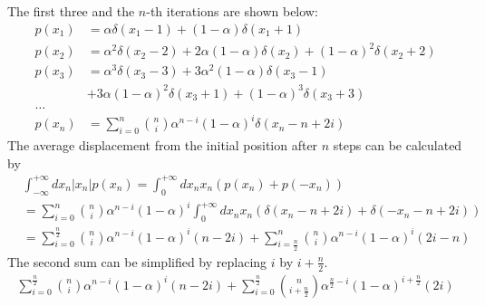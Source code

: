 \documentclass{tstextbook}
\begin{document}
\begin{example}
The first three and the $n$-th iterations are shown below:
  \begin{equation}
  \begin{aligned}
  p\left(x_{1}\right) &= \alpha \delta\left(x_{1}-1\right)+(1-\alpha) \delta\left(x_{1}+1\right)\\   p\left(x_{2}\right) &= \alpha^2 \delta\left(x_{2}-2\right)                       + 2 \alpha (1-\alpha) \delta\left(x_{2}\right) + (1-\alpha)^2 \delta\left(x_{2}+2\right)\\
  p\left(x_{3}\right) &= \alpha^3 \delta\left(x_{3}-3\right)                       + 3 \alpha^2 (1-\alpha) \delta\left(x_{3}-1\right) \\
  & + 3 \alpha (1-\alpha)^2 \delta\left(x_{3}+1\right) + (1-\alpha)^3 \delta\left(x_{3}+3\right)\\
  \ldots & \\
  p\left(x_{n}\right) &= \sum_{i=0}^{n}{{n}\choose{i}}\alpha^{n-i} (1-\alpha)^{i} \delta\left(x_{n}-n+2i\right)
  \end{aligned}
  \end{equation}
The average displacement from the initial position after $n$ steps can be calculated by
  \begin{equation}
  \begin{aligned}
  & \int_{-\infty}^{+\infty}dx_{n}\vert x_{n} \vert p\left(x_{n}\right) = \int_{0}^{+\infty}dx_{n} x_{n} \left(p\left(x_{n}\right) + p\left(-x_{n}\right)\right)\\
&=\sum_{i=0}^{n}{{n}\choose{i}}\alpha^{n-i} (1-\alpha)^{i}\int_{0}^{+\infty}dx_{n} x_{n} \left(\delta\left(x_{n}-n+2i\right) + \delta\left(-x_{n}-n+2i\right)\right)\\
&=\sum_{i=0}^{\frac{n}{2}}{{n}\choose{i}}\alpha^{n-i} (1-\alpha)^{i}\left(n-2i\right)+
\sum_{i=\frac{n}{2}}^{n}{{n}\choose{i}}\alpha^{n-i} (1-\alpha)^{i}\left(2i-n\right)
  \end{aligned}
  \end{equation}
The second sum can be simplified by replacing $i$ by $i+\frac{n}{2}$.
  \begin{equation}
  \begin{aligned}
\sum_{i=0}^{\frac{n}{2}}{{n}\choose{i}}\alpha^{n-i} (1-\alpha)^{i}\left(n-2i\right)+
\sum_{i=0}^{\frac{n}{2}}{{n}\choose{i+\frac{n}{2}}}\alpha^{\frac{n}{2}-i} (1-\alpha)^{i+\frac{n}{2}}\left(2i\right)
  \end{aligned}
  \end{equation}

\end{example}
\end{document}
